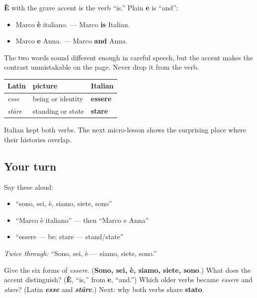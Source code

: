 \begin{grammarlens}[title={Grammar Lens: one accent and two words}]
\textbf{È} with the grave accent is the verb “is.” Plain \textbf{e} is “and”:

\begin{itemize}
\raggedright
  \item Marco \textbf{è} italiano. — Marco \textbf{is} Italian.
  \item Marco \textbf{e} Anna. — Marco \textbf{and} Anna.
\end{itemize}

The two words sound different enough in careful speech, but the accent makes the contrast unmistakable on the page. Never drop it from the verb.
\end{grammarlens}

\begin{cousinweb}
\noindent
\begin{tabularx}{\linewidth}{@{}>{\raggedright\arraybackslash}X>{\raggedright\arraybackslash}X>{\raggedright\arraybackslash}X@{}}
\toprule
\textbf{Latin} & \textbf{picture} & \textbf{Italian} \\
\midrule
\emph{esse} & being or identity & \textbf{essere} \\
\emph{stāre} & standing or state & \textbf{stare} \\
\bottomrule
\end{tabularx}

Italian kept both verbs. The next micro-lesson shows the surprising place where their histories overlap.
\end{cousinweb}

\subsection*{Your turn}
Say these aloud:

\begin{itemize}
\raggedright
  \item “sono, sei, è, siamo, siete, sono”
  \item “Marco è italiano” — then “Marco e Anna”
  \item “essere — be; stare — stand/state”
\end{itemize}

\emph{Twice through:} “Sono, sei, è — siamo, siete, sono.”

\begin{tcolorbox}[breakable,colback=teal!4,colframe=teal!35!black,title={Before you move on}]
Give the six forms of \emph{essere}. (\textbf{Sono, sei, è, siamo, siete, sono}.) What does the accent distinguish? (\textbf{È}, “is,” from \textbf{e}, “and.”) Which older verbs became \emph{essere} and \emph{stare}? (Latin \emph{\textbf{esse}} and \emph{\textbf{stāre}}.) Next: why both verbs share \textbf{stato}.
\end{tcolorbox}
